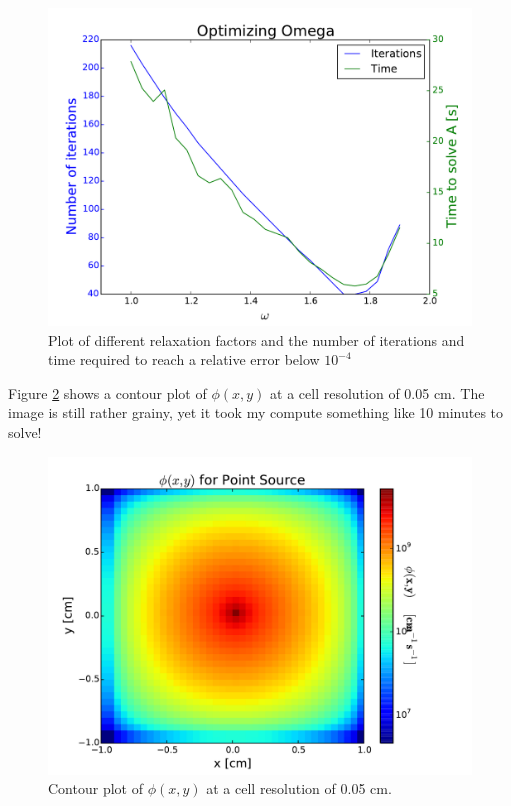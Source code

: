 \documentclass[a4paper,12pt]{article}
\begin{document}
\begin{figure}
\centering
\includegraphics[width=.5\textwidth]{opt_omega_center_source.pdf}
\caption{\label{optimal omega} Plot of different relaxation factors and the number of iterations and time required to reach a relative error below $10^{-4}$}
\end{figure}

Figure \ref{contour plot} shows a contour plot of $\phi(x,y)$ at a cell resolution of 0.05 cm. The image is still rather grainy, yet it took my compute something like 10 minutes to solve!

\begin{figure}
\centering
\includegraphics{point_source_2D_big.pdf}
\caption{\label{contour plot} Contour plot of $\phi(x,y)$ at a cell resolution of 0.05 cm.}
\end{figure}



\end{document}
